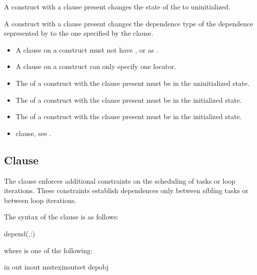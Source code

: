 A  construct with a  clause present changes the 
state of the  to uninitialized.

A  construct with a  clause present changes the 
dependence type of the dependence represented by  to the one 
specified by the  clause.

\restrictions
\begin{itemize}
\item A  clause on a  construct must not have 
      ,  or  as .
\item A  clause on a  construct can only specify 
      one locator.
\item The  of a  construct with the  
      clause present must be in the uninitialized state.
\item The  of a  construct with the  
      clause present must be in the initialized state.
\item The  of a  construct with the  
      clause present must be in the initialized state.
\end{itemize}

\crossreferences
\begin{itemize}
 \item {} clause, see .
\end{itemize}



\subsection{ Clause}
\label{subsec:depend Clause}
\summary
The  clause enforces additional constraints on the scheduling 
of tasks or loop iterations. These constraints establish dependences only 
between sibling tasks or between loop iterations.

\syntax
The syntax of the  clause is as follows:

\begin{ompSyntax}
depend(\plc{[depend-modifier},\plc{]dependence-type }:)
\end{ompSyntax}

where  is one of the following:
\begin{indentedcodelist}
in
out
inout
mutexinoutset
depobj
\end{indentedcodelist}

